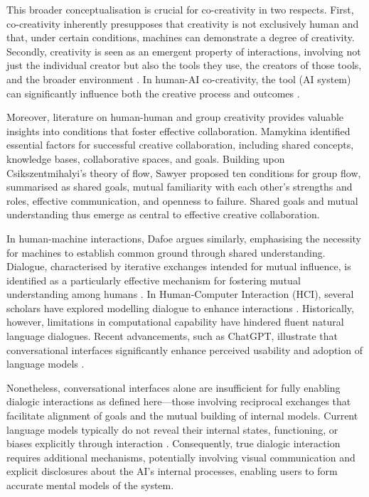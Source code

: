 This broader conceptualisation is crucial for co-creativity in two respects. First, co-creativity inherently presupposes that creativity is not exclusively human and that, under certain conditions, machines can demonstrate a degree of creativity. Secondly, creativity is seen as an emergent property of interactions, involving not just the individual creator but also the tools they use, the creators of those tools, and the broader environment \cite{Malafouris2008-xn}. In human-AI co-creativity, the tool (AI system) can significantly influence both the creative process and outcomes \cite{Davis2016-te}.

Moreover, literature on human-human and group creativity provides valuable insights into conditions that foster effective collaboration. Mamykina \cite{Mamykina2002-lm} identified essential factors for successful creative collaboration, including shared concepts, knowledge bases, collaborative spaces, and goals. Building upon Csikszentmihalyi’s theory of flow, Sawyer \cite{Sawyer2007-rw} proposed ten conditions for group flow, summarised as shared goals, mutual familiarity with each other's strengths and roles, effective communication, and openness to failure. Shared goals and mutual understanding thus emerge as central to effective creative collaboration.

In human-machine interactions, Dafoe \cite{Dafoe2021-in} argues similarly, emphasising the necessity for machines to establish common ground through shared understanding. Dialogue, characterised by iterative exchanges intended for mutual influence, is identified as a particularly effective mechanism for fostering mutual understanding among humans \cite{Bohm1996-fo}. In Human-Computer Interaction (HCI), several scholars have explored modelling dialogue to enhance interactions \cite{Allen1999-sr, Suchman2006-bs, Hayes1983-ca}. Historically, however, limitations in computational capability have hindered fluent natural language dialogues. Recent advancements, such as ChatGPT, illustrate that conversational interfaces significantly enhance perceived usability and adoption of language models \cite{Brockman, the others}.

Nonetheless, conversational interfaces alone are insufficient for fully enabling dialogic interactions as defined here—those involving reciprocal exchanges that facilitate alignment of goals and the mutual building of internal models. Current language models typically do not reveal their internal states, functioning, or biases explicitly through interaction \cite{Templeton2024-ej, Turpin2023-ow}. Consequently, true dialogic interaction requires additional mechanisms, potentially involving visual communication and explicit disclosures about the AI's internal processes, enabling users to form accurate mental models of the system.

